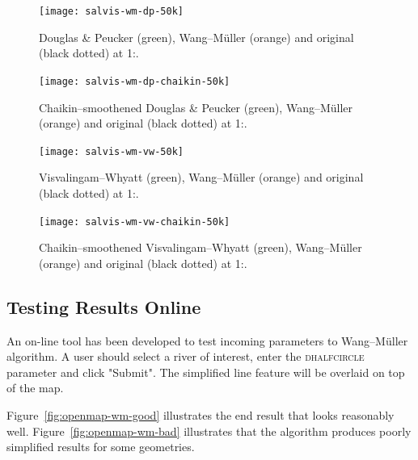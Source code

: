 \documentclass[a4paper]{article}
\newcommand{\DP}{Douglas \& Peucker}
\newcommand{\VW}{Visvalingam--Whyatt}
\newcommand{\WM}{Wang--M{\"u}ller}
\begin{document}
\begin{figure}[h!]
    \texttt{[image: salvis-wm-dp-50k]}


    \caption{{\DP} (green), {\WM} (orange) and original (black dotted) at
    1:.}

    \label{fig:salvis-wm-dp-50k}
\end{figure}

\begin{figure}[h!]
    \texttt{[image: salvis-wm-dp-chaikin-50k]}

    \caption{Chaikin--smoothened {\DP} (green), {\WM} (orange) and original
    (black dotted) at 1:.}

    \label{fig:salvis-wm-dp-chaikin-50k}
\end{figure}


\begin{figure}[h!]
    \texttt{[image: salvis-wm-vw-50k]}

    \caption{{\VW} (green), {\WM} (orange) and original (black dotted) at
    1:.}

    \label{fig:salvis-wm-vw-50k}
\end{figure}

\begin{figure}[h!]
    \texttt{[image: salvis-wm-vw-chaikin-50k]}

    \caption{Chaikin--smoothened {\VW} (green), {\WM} (orange) and original
    (black dotted) at 1:.}

    \label{fig:salvis-wm-vw-chaikin-50k}
\end{figure}


\subsection{Testing Results Online}
\label{sec:testing-results-online}

An on-line tool\cite{openmapwm} has been developed to test incoming parameters
to {\WM} algorithm. A user should select a river of interest, enter the
\textsc{dhalfcircle} parameter and click "Submit". The simplified line feature
will be overlaid on top of the map.

Figure~\ref{fig:openmap-wm-good} illustrates the end result that looks
reasonably well. Figure~\ref{fig:openmap-wm-bad} illustrates that the algorithm
produces poorly simplified results for some geometries.
\end{document}
